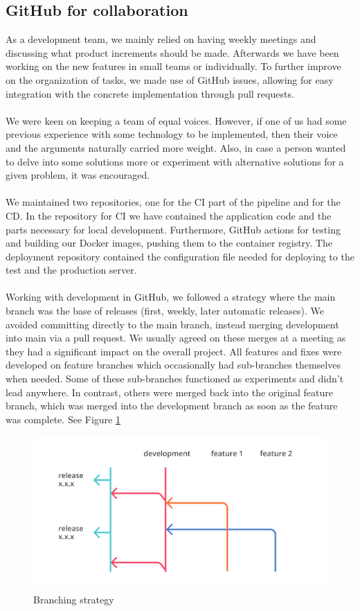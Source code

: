 \documentclass[11pt]{article}
\begin{document}
\subsection{GitHub for collaboration}
As a development team, we mainly relied on having weekly meetings and discussing what product increments should be made. Afterwards we have been working on the new features in small teams or individually. To further improve on the organization of tasks, we made use of GitHub issues, allowing for easy integration with the concrete implementation through pull requests.
\\\\
We were keen on keeping a team of equal voices. However, if one of us had some previous experience with some technology to be implemented, then their voice and the arguments naturally carried more weight. Also, in case a person wanted to delve into some solutions more or experiment with alternative solutions for a given problem, it was encouraged. 
\\\\
We maintained two repositories, one for the CI part of the pipeline and for the CD. In the repository for CI we have contained the application code and the parts necessary for local development. Furthermore, GitHub actions for testing and building our Docker images, pushing them to the container registry. The deployment repository contained the configuration file needed for deploying to the test and the production server.
\\\\
Working with development in GitHub, we followed a strategy where the main branch was the base of releases (first, weekly, later automatic releases). We avoided committing directly to the main branch, instead merging development into main via a pull request. We usually agreed on these merges at a meeting as they had a significant impact on the overall project. All features and fixes were developed on feature branches which occasionally had sub-branches themselves when needed. Some of these sub-branches functioned as experiments and didn't lead anywhere. In contrast, others were merged back into the original feature branch, which was merged into the development branch as soon as the feature was complete. See Figure \ref{fig:branching}
\begin{figure}[h!]
    \centering
    \includegraphics[width=12cm]{figures/branching.png}
    \caption{Branching strategy}
    \label{fig:branching}
\end{figure}
\end{document}
